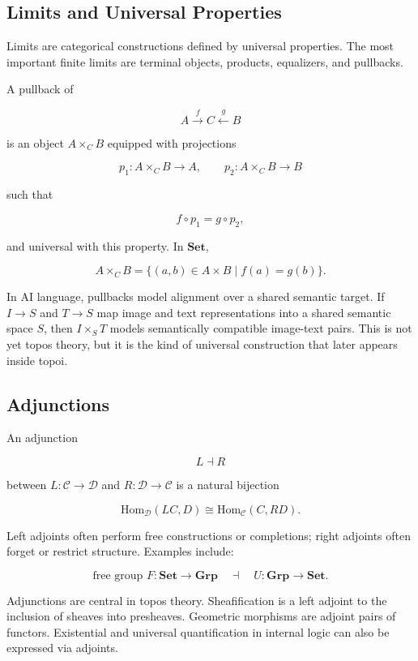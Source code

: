 \documentclass[11pt]{article}
\begin{document}
\subsection{Limits and Universal Properties}

Limits are categorical constructions defined by universal properties. The most important finite limits are terminal objects, products, equalizers, and pullbacks.


A pullback of


\[
A\xrightarrow{f}C\xleftarrow{g}B
\]

is an object \(A\times_C B\) equipped with projections


\[
p_1:A\times_C B\to A,\qquad p_2:A\times_C B\to B
\]

such that


\[
f\circ p_1=g\circ p_2,
\]

and universal with this property. In \(\mathbf{Set}\),


\[
A\times_C B
=\{(a,b)\in A\times B\mid f(a)=g(b)\}.
\]

In AI language, pullbacks model alignment over a shared semantic target. If \(I\to S\) and \(T\to S\) map image and text representations into a shared semantic space \(S\), then \(I\times_S T\) models semantically compatible image-text pairs. This is not yet topos theory, but it is the kind of universal construction that later appears inside topoi.


\subsection{Adjunctions}

An adjunction


\[
L\dashv R
\]

between \(L:\mathcal{C}\to\mathcal{D}\) and \(R:\mathcal{D}\to\mathcal{C}\) is a natural bijection


\[
\mathrm{Hom}_{\mathcal{D}}(LC,D)
\cong
\mathrm{Hom}_{\mathcal{C}}(C,RD).
\]

Left adjoints often perform free constructions or completions; right adjoints often forget or restrict structure. Examples include:


\[
\text{free group }F:\mathbf{Set}\to\mathbf{Grp}
\quad\dashv\quad
U:\mathbf{Grp}\to\mathbf{Set}.
\]

Adjunctions are central in topos theory. Sheafification is a left adjoint to the inclusion of sheaves into presheaves. Geometric morphisms are adjoint pairs of functors. Existential and universal quantification in internal logic can also be expressed via adjoints.
\end{document}
